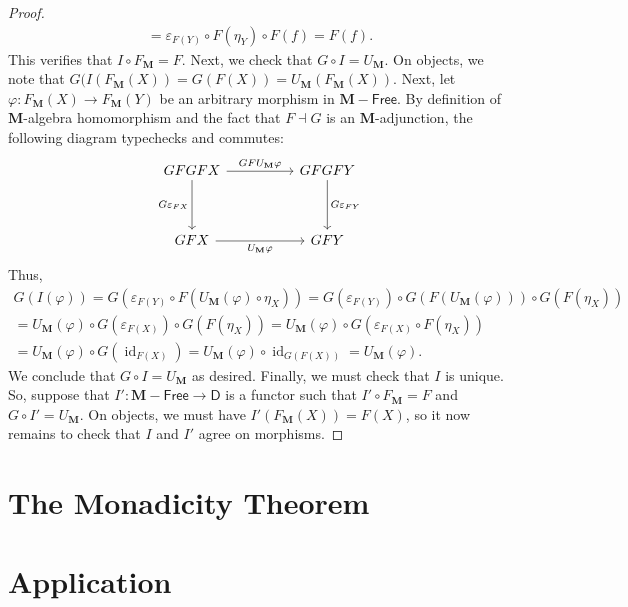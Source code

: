 \documentclass{article}
\theoremstyle{definition}
\newcommand{\D}{\mathsf{D}}
\newcommand{\M}{\mathbf{M}}
\DeclareMathOperator{\id}{id}
\newcommand{\Free}{\mathsf{Free}}
\begin{document}
\begin{proof}
\begin{multline*}
        = \varepsilon_{F(Y)} \circ F(\eta_Y) \circ F(f)
        = F(f).
    \end{multline*}
    This verifies that $I \circ F_{\M} = F$. Next, we check that $G \circ I = U_{\M}$. On objects, we note that $G(I(F_{\M}(X)) = G(F(X)) = U_{\M}(F_{\M}(X))$. Next, let $\varphi : F_{\M}(X) \to F_{\M}(Y)$ be an arbitrary morphism in $\M{-}\Free$. By definition of $\M$-algebra homomorphism and the fact that $F \dashv G$ is an $\M$-adjunction, the following diagram typechecks and commutes:
    \[\begin{tikzcd}[ampersand replacement=\&]
    	GFGFX \&\& GFGFY \\
    	\\
    	GFX \&\& GFY
    	\arrow["{GFU_{\M}\varphi}", from=1-1, to=1-3]
    	\arrow["{G\varepsilon_{FX}}"', from=1-1, to=3-1]
    	\arrow["{U_{\M}\varphi}"', from=3-1, to=3-3]
    	\arrow["{G\varepsilon_{FY}}", from=1-3, to=3-3]
    \end{tikzcd}\]
    Thus,
    \begin{multline*}
        G(I(\varphi))
        = G(\varepsilon_{F(Y)} \circ F(U_{\M}(\varphi) \circ \eta_X))
        = G(\varepsilon_{F(Y)}) \circ G(F(U_{\M}(\varphi))) \circ G(F(\eta_X))\\
        = U_{\M}(\varphi) \circ G(\varepsilon_{F(X)}) \circ G(F(\eta_X))
        = U_{\M}(\varphi) \circ G(\varepsilon_{F(X)} \circ F(\eta_X))\\
        = U_{\M}(\varphi) \circ G(\id_{F(X)})
        = U_{\M}(\varphi) \circ \id_{G(F(X))}
        = U_{\M}(\varphi).
    \end{multline*}
    We conclude that $G \circ I = U_{\M}$ as desired. Finally, we must check that $I$ is unique. So, suppose that $I' : \M{-}\Free \to \D$ is a functor such that $I' \circ F_{\M} = F$ and $G \circ I' = U_{\M}$. On objects, we must have $I'(F_{\M}(X)) = F(X)$, so it now remains to check that $I$ and $I'$ agree on morphisms.
\end{proof}

\section{The Monadicity Theorem}

\section{Application}
\end{document}

